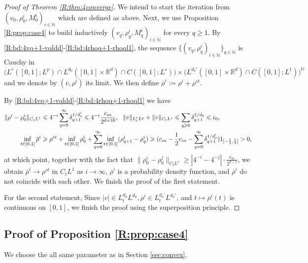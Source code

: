 \documentclass[10pt,a4paper]{amsart}
\numberwithin{equation}{section}
\def\({{\Big(}}
\def\){{\Big)}}
\def\mN{{\mathbb N}}
\def\geq{\geqslant}
\def\leq{\leqslant}
\def\({{\Big(}}
\def\){{\Big)}}
\def\geq{\geqslant}
\def\leq{\leqslant}
\def\N{\mathbb N} \def\kk{\zeta} \def\m{{\bf m}}
\begin{document}
 \begin{proof}[Proof of   Theorem \ref{R:thm:4converge}]
We intend to start the iteration from 
$(v_0, \rho^{i}_0,  M^{i}_0)_{i\in\mN}$ which are defined as above. 
 Next, we use Proposition \ref{R:prop:case4} to build inductively $(v_q,\rho^{i}_q, M^{i}_q)_{i\in\mN}$ for every $q \geq 1$. By   \eqref{R:bd:4vq+1-vqldd}-\eqref{R:bd:4rhoq+1-rhoql1}, the sequence $\{(v_q,\rho^{i}_q)_{i\in\mN}\}_{q\in \N}$ is
Cauchy in 
$\(L^r([0,1];L^p)\cap L^{d_0}([0,1]\times \mathbb{R}^d)\cap C([0,1];L^s)\)\times \(L^{d_0'}([0,1]\times \mathbb{R}^d)\cap C([0,1];L^1)\)^{\mN}$ 
     and we denote by $(v,\rho^{i})$ its limit.    We then define $\overline \rho^i:=\rho^i+\rho^{st}$.  
   

 By \eqref{R:bd:4vq+1-vqldd}-\eqref{R:bd:4rhoq+1-rhoql1} we have
\begin{align} 
  \|\rho^i-\rho_0^i\|_{C_tL^1}&\leq
4^{-i}\sum_{q=0}^\infty\delta_{q+1}^{1/{d_0'}}\leq 4^{-i} \frac{c_{in}}{2^{d+10}},\  \  \|v \|_{L^{r}_tL^{p}}+\|v  \|_{C_tL^s}\leq 
\sum_{q\geq0}\delta_{q+1}^{1/d_0}\leq\epsilon_0,\notag\\
\inf_{t\in [0,1]}\overline \rho^i &\geq \rho^{st}+ \inf_{t\in [0,1]} \rho_0^i +
\sum_{q=0}^\infty \inf_{t\in [0,1]}(\rho_{q+1}^i- \rho_q^i) \geq (c_{in}-\frac12c_{in}-\sum_{q=0}^\infty \delta_{q+1}^{1/d_0'})1_{[-\frac12,\frac12]}>0,\notag
\end{align}
at which point, together with the fact that $\|\rho^i_0-\rho_0^j\|_{C_tL^1}\geq |4^{-i}-4^{-j}|\cdot \frac{c_{in}}{2^{d+1}}$, we obtain $\overline\rho^i\to \rho^{st}$ in $ C_tL^1$ as $i\to\infty$,   
 $\overline\rho^{i}$ is a  probability density function, and $\overline\rho^i$
 do not coincide with each other. 
 We finish the proof of the first statement. 

 For the second statement,
Since $|v| \in L_{t}^{d_0 }L^{d_0 },\overline \rho^i \in L_{t}^{d_0'}L^{d_0'}$,  and 
$
t\mapsto \overline\rho^i(t)
$
is continuous on $[0,1]$, we finish the proof using the superposition principle.
 \end{proof}

\subsection{ Proof of Proposition \ref{R:prop:case4}} 
We choose the all same parameter as in Section \ref{sec:convex}.
\end{document}
